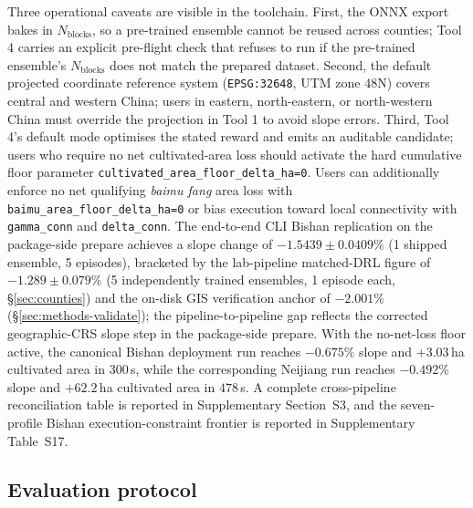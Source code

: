 \documentclass[11pt]{article}
\begin{document}
Three operational caveats are visible in the toolchain. First, the ONNX export bakes in $N_{\text{blocks}}$, so a pre-trained ensemble cannot be reused across counties; Tool 4 carries an explicit pre-flight check that refuses to run if the pre-trained ensemble's $N_{\text{blocks}}$ does not match the prepared dataset. Second, the default projected coordinate reference system (\texttt{EPSG:32648}, UTM zone 48N) covers central and western China; users in eastern, north-eastern, or north-western China must override the projection in Tool 1 to avoid slope errors. Third, Tool 4's default mode optimises the stated reward and emits an auditable candidate; users who require no net cultivated-area loss should activate the hard cumulative floor parameter \texttt{cultivated\_area\_floor\_delta\_ha=0}. Users can additionally enforce no net qualifying \textit{baimu fang} area loss with \texttt{baimu\_area\_floor\_delta\_ha=0} or bias execution toward local connectivity with \texttt{gamma\_conn} and \texttt{delta\_conn}. The end-to-end CLI Bishan replication on the package-side prepare achieves a slope change of $-1.5439 \pm 0.0409\%$ (1 shipped ensemble, 5 episodes), bracketed by the lab-pipeline matched-DRL figure of $-1.289 \pm 0.079\%$ (5 independently trained ensembles, 1 episode each, \S\ref{sec:counties}) and the on-disk GIS verification anchor of $-2.001\%$ (\S\ref{sec:methods-validate}); the pipeline-to-pipeline gap reflects the corrected geographic-CRS slope step in the package-side prepare. With the no-net-loss floor active, the canonical Bishan deployment run reaches $-0.675\%$ slope and $+3.03$\,ha cultivated area in $300$\,s, while the corresponding Neijiang run reaches $-0.492\%$ slope and $+62.2$\,ha cultivated area in $478$\,s. A complete cross-pipeline reconciliation table is reported in Supplementary Section~S3, and the seven-profile Bishan execution-constraint frontier is reported in Supplementary Table~S17.

\subsection{Evaluation protocol}
\end{document}
